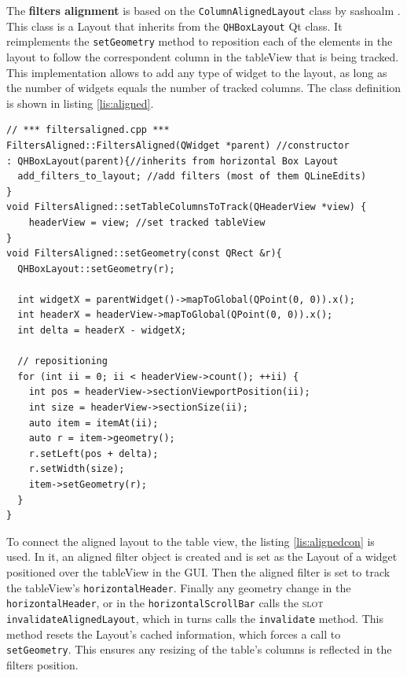 The \textbf{filters alignment} is based on the \texttt{ColumnAlignedLayout} class by sashoalm \cite{aligned}. This class is a Layout that inherits from the \texttt{QHBoxLayout} Qt class. It reimplements the \texttt{setGeometry} method to reposition each of the elements in the layout to follow the correspondent column in the tableView that is being tracked. This implementation allows to add any type of widget to the layout, as long as the number of widgets equals the number of tracked columns. The class definition is shown in listing \ref{lis:aligned}.

\begin{lstlisting}[style=customc, float=htb, caption={Aligned Filters definition}, label = {lis:aligned}]
// *** filtersaligned.cpp ***
FiltersAligned::FiltersAligned(QWidget *parent) //constructor
: QHBoxLayout(parent){//inherits from horizontal Box Layout
  add_filters_to_layout; //add filters (most of them QLineEdits)
}
void FiltersAligned::setTableColumnsToTrack(QHeaderView *view) {
    headerView = view; //set tracked tableView
}
void FiltersAligned::setGeometry(const QRect &r){
  QHBoxLayout::setGeometry(r);

  int widgetX = parentWidget()->mapToGlobal(QPoint(0, 0)).x();
  int headerX = headerView->mapToGlobal(QPoint(0, 0)).x();
  int delta = headerX - widgetX;

  // repositioning
  for (int ii = 0; ii < headerView->count(); ++ii) {
    int pos = headerView->sectionViewportPosition(ii);
    int size = headerView->sectionSize(ii);
    auto item = itemAt(ii);
    auto r = item->geometry();
    r.setLeft(pos + delta);
    r.setWidth(size);
    item->setGeometry(r);
  }
}
\end{lstlisting}

To connect the aligned layout to the table view, the listing \ref{lis:alignedcon} is used. In it, an aligned filter object is created and is set as the Layout of a widget positioned over the tableView in the GUI. Then the aligned filter is set to track the tableView's \texttt{horizontalHeader}. Finally any geometry change in the \texttt{horizontalHeader}, or in the \texttt{horizontalScrollBar} calls the \textsc{slot} \texttt{invalidateAlignedLayout}, which in turns calls the \texttt{invalidate} method. This method resets the Layout's cached information, which forces a call to \texttt{setGeometry}. This ensures any resizing of the table's columns is reflected in the filters position.


